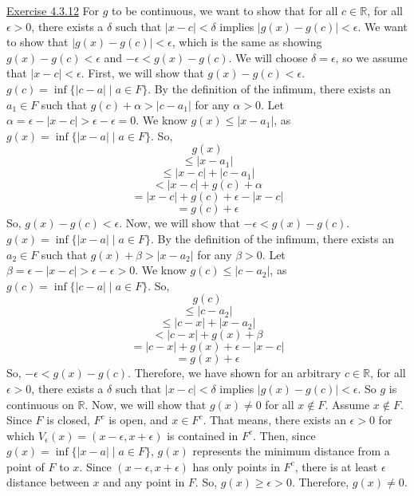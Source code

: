 \documentclass{exam}
\begin{document}
\underline{Exercise 4.3.12}
\newline
\newline
For $g$ to be continuous, we want to show that for all $c\in \mathbb{R}$, for all $\epsilon>0$, there exists a $\delta$ such that $|x-c|<\delta$ implies $|g(x)-g(c)|<\epsilon$. We want to show that $|g(x)-g(c)|<\epsilon$, which is the same as showing $g(x)-g(c)<\epsilon$ and $-\epsilon<g(x)-g(c)$. We will choose $\delta=\epsilon$, so we assume that $|x-c|<\epsilon$.
\newline
\newline
First, we will show that $g(x)-g(c)<\epsilon$. $g(c)=\inf\{|c-a|\mid a\in F\}$. By the definition of the infimum, there exists an $a_1\in F$ such that $g(c)+\alpha>|c-a_1|$ for any $\alpha>0$. Let $\alpha=\epsilon-|x-c|>\epsilon-\epsilon=0$. We know $g(x)\le |x-a_1|$, as $g(x)=\inf\{|x-a|\mid a\in F\}$. So,
\[g(x)\]
\[\le |x-a_1|\]
\[\le |x-c|+|c-a_1|\]
\[<|x-c|+g(c)+\alpha\]
\[=|x-c|+g(c)+\epsilon-|x-c|\]
\[=g(c)+\epsilon\]
So, $g(x)-g(c)<\epsilon$.
\newline
\newline
Now, we will show that $-\epsilon<g(x)-g(c)$. $g(x)=\inf\{|x-a|\mid a\in F\}$. By the definition of the infimum, there exists an $a_2\in F$ such that $g(x)+\beta>|x-a_2|$ for any $\beta>0$. Let $\beta=\epsilon-|x-c|>\epsilon-\epsilon>0$. We know $g(c)\le|c-a_2|$, as $g(c)=\inf\{|c-a|\mid a\in F\}$. So,
\[g(c)\]
\[\le |c-a_2|\]
\[\le |c-x|+|x-a_2|\]
\[<|c-x|+g(x)+\beta\]
\[=|c-x|+g(x)+\epsilon-|x-c|\]
\[=g(x)+\epsilon\]
So, $-\epsilon<g(x)-g(c)$. Therefore, we have shown for an arbitrary $c\in \mathbb{R}$, for all $\epsilon>0$, there exists a $\delta$ such that $|x-c|<\delta$ implies $|g(x)-g(c)|<\epsilon$. So $g$ is continuous on $\mathbb{R}$.
\newline
\newline
Now, we will show that $g(x)\ne0$ for all $x\notin F$. Assume $x\notin F$. Since $F$ is closed, $F^c$ is open, and $x\in F^c$. That means, there exists an $\epsilon>0$ for which $V_\epsilon(x)=(x-\epsilon,x+\epsilon)$ is contained in $F^c$. Then, since $g(x)=\inf\{|x-a|\mid a\in F\}$, $g(x)$ represents the minimum distance from a point of $F$ to $x$. Since $(x-\epsilon,x+\epsilon)$ has only points in $F^c$, there is at least $\epsilon$ distance between $x$ and any point in $F$. So, $g(x)\ge\epsilon>0$. Therefore, $g(x)\ne0$.
\newline
\end{document}

